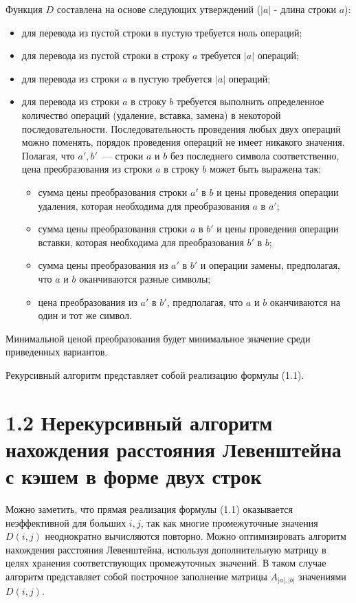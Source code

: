 \documentclass[12pt, a4paper]{report}
\begin{document}
Функция $D$ составлена на основе следующих утверждений ($|a|$ - длина строки $a$):
\begin{itemize}
	\item для перевода из пустой строки в пустую требуется ноль операций;
	\item для перевода из пустой строки в строку $a$ требуется $|a|$ операций;
	\item для перевода из строки $a$ в пустую требуется $|a|$ операций;
	\item для перевода из строки $a$ в строку $b$ требуется выполнить определенное количество операций (удаление, вставка, замена) в некоторой последовательности. Последовательность проведения любых двух операций можно поменять, порядок проведения операций не имеет никакого значения. Полагая, что $a', b'$~--- строки $a$ и $b$ без последнего символа соответственно, цена преобразования из строки $a$ в строку $b$ может быть выражена так:
	\begin{itemize}
		\item сумма цены преобразования строки $a'$ в $b$ и цены проведения операции удаления, которая необходима для преобразования $a$ в $a'$;
		\item сумма цены преобразования строки $a$ в $b'$  и цены проведения операции вставки, которая необходима для преобразования $b'$ в $b$;
		\item сумма цены преобразования из $a'$ в $b'$ и операции замены, предполагая, что $a$ и $b$ оканчиваются разные символы;
		\item цена преобразования из $a'$ в $b'$, предполагая, что $a$ и $b$ оканчиваются на один и тот же символ.
	\end{itemize}
\end{itemize}
\noindent Минимальной ценой преобразования будет минимальное значение среди приведенных вариантов.

Рекурсивный алгоритм представляет собой реализацию формулы (1.1).

\section*{1.2 Нерекурсивный алгоритм нахождения расстояния Левенштейна с кэшем в форме двух строк}

Можно заметить, что прямая реализация формулы (1.1) оказывается неэффективной для больших $i, j$, так как многие промежуточные значения $D(i, j)$ неоднократно вычисляются повторно.
Можно оптимизировать алгоритм нахождения расстояния Левенштейна, используя дополнительную матрицу в целях хранения соответствующих промежуточных значений. В таком случае алгоритм представляет собой построчное заполнение матрицы $A_{|a|,|b|}$ значениями $D(i, j)$. 
\end{document}
